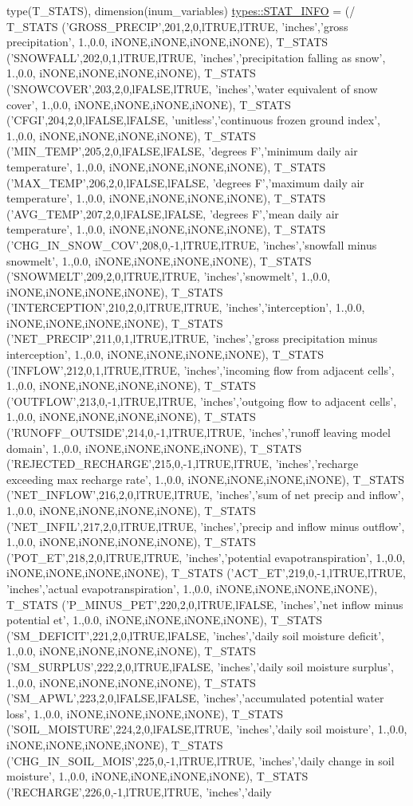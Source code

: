 \begin{DoxyCompactItemize}
type(T\_\-STATS), dimension(inum\_\-variables) \hyperlink{namespacetypes_a594f13f31f2b14db76202ca868ec9001}{types::STAT\_\-INFO} = (/ T\_\-STATS ('GROSS\_\-PRECIP',201,2,0,lTRUE,lTRUE, 'inches','gross precipitation', 1.,0.0, iNONE,iNONE,iNONE,iNONE), T\_\-STATS ('SNOWFALL',202,0,1,lTRUE,lTRUE, 'inches','precipitation falling as snow', 1.,0.0, iNONE,iNONE,iNONE,iNONE), T\_\-STATS ('SNOWCOVER',203,2,0,lFALSE,lTRUE, 'inches','water equivalent of snow cover', 1.,0.0, iNONE,iNONE,iNONE,iNONE), T\_\-STATS ('CFGI',204,2,0,lFALSE,lFALSE, 'unitless','continuous frozen ground index', 1.,0.0, iNONE,iNONE,iNONE,iNONE), T\_\-STATS ('MIN\_\-TEMP',205,2,0,lFALSE,lFALSE, 'degrees F','minimum daily air temperature', 1.,0.0, iNONE,iNONE,iNONE,iNONE), T\_\-STATS ('MAX\_\-TEMP',206,2,0,lFALSE,lFALSE, 'degrees F','maximum daily air temperature', 1.,0.0, iNONE,iNONE,iNONE,iNONE), T\_\-STATS ('AVG\_\-TEMP',207,2,0,lFALSE,lFALSE, 'degrees F','mean daily air temperature', 1.,0.0, iNONE,iNONE,iNONE,iNONE), T\_\-STATS ('CHG\_\-IN\_\-SNOW\_\-COV',208,0,-\/1,lTRUE,lTRUE, 'inches','snowfall minus snowmelt', 1.,0.0, iNONE,iNONE,iNONE,iNONE), T\_\-STATS ('SNOWMELT',209,2,0,lTRUE,lTRUE, 'inches','snowmelt', 1.,0.0, iNONE,iNONE,iNONE,iNONE), T\_\-STATS ('INTERCEPTION',210,2,0,lTRUE,lTRUE, 'inches','interception', 1.,0.0, iNONE,iNONE,iNONE,iNONE), T\_\-STATS ('NET\_\-PRECIP',211,0,1,lTRUE,lTRUE, 'inches','gross precipitation minus interception', 1.,0.0, iNONE,iNONE,iNONE,iNONE), T\_\-STATS ('INFLOW',212,0,1,lTRUE,lTRUE, 'inches','incoming flow from adjacent cells', 1.,0.0, iNONE,iNONE,iNONE,iNONE), T\_\-STATS ('OUTFLOW',213,0,-\/1,lTRUE,lTRUE, 'inches','outgoing flow to adjacent cells', 1.,0.0, iNONE,iNONE,iNONE,iNONE), T\_\-STATS ('RUNOFF\_\-OUTSIDE',214,0,-\/1,lTRUE,lTRUE, 'inches','runoff leaving model domain', 1.,0.0, iNONE,iNONE,iNONE,iNONE), T\_\-STATS ('REJECTED\_\-RECHARGE',215,0,-\/1,lTRUE,lTRUE, 'inches','recharge exceeding max recharge rate', 1.,0.0, iNONE,iNONE,iNONE,iNONE), T\_\-STATS ('NET\_\-INFLOW',216,2,0,lTRUE,lTRUE, 'inches','sum of net precip and inflow', 1.,0.0, iNONE,iNONE,iNONE,iNONE), T\_\-STATS ('NET\_\-INFIL',217,2,0,lTRUE,lTRUE, 'inches','precip and inflow minus outflow', 1.,0.0, iNONE,iNONE,iNONE,iNONE), T\_\-STATS ('POT\_\-ET',218,2,0,lTRUE,lTRUE, 'inches','potential evapotranspiration', 1.,0.0, iNONE,iNONE,iNONE,iNONE), T\_\-STATS ('ACT\_\-ET',219,0,-\/1,lTRUE,lTRUE, 'inches','actual evapotranspiration', 1.,0.0, iNONE,iNONE,iNONE,iNONE), T\_\-STATS ('P\_\-MINUS\_\-PET',220,2,0,lTRUE,lFALSE, 'inches','net inflow minus potential et', 1.,0.0, iNONE,iNONE,iNONE,iNONE), T\_\-STATS ('SM\_\-DEFICIT',221,2,0,lTRUE,lFALSE, 'inches','daily soil moisture deficit', 1.,0.0, iNONE,iNONE,iNONE,iNONE), T\_\-STATS ('SM\_\-SURPLUS',222,2,0,lTRUE,lFALSE, 'inches','daily soil moisture surplus', 1.,0.0, iNONE,iNONE,iNONE,iNONE), T\_\-STATS ('SM\_\-APWL',223,2,0,lFALSE,lFALSE, 'inches','accumulated potential water loss', 1.,0.0, iNONE,iNONE,iNONE,iNONE), T\_\-STATS ('SOIL\_\-MOISTURE',224,2,0,lFALSE,lTRUE, 'inches','daily soil moisture', 1.,0.0, iNONE,iNONE,iNONE,iNONE), T\_\-STATS ('CHG\_\-IN\_\-SOIL\_\-MOIS',225,0,-\/1,lTRUE,lTRUE, 'inches','daily change in soil moisture', 1.,0.0, iNONE,iNONE,iNONE,iNONE), T\_\-STATS ('RECHARGE',226,0,-\/1,lTRUE,lTRUE, 'inches','daily 
\end{DoxyCompactItemize}
